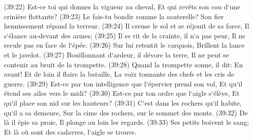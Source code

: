 \verse (39:22) Est-ce toi qui donnes la vigueur au cheval, Et qui revêts son cou d`une crinière flottante? 
\verse (39:23) Le fais-tu bondir comme la sauterelle? Son fier hennissement répand la terreur. 
\verse (39:24) Il creuse le sol et se réjouit de sa force, Il s`élance au-devant des armes; 
\verse (39:25) Il se rit de la crainte, il n`a pas peur, Il ne recule pas en face de l`épée. 
\verse (39:26) Sur lui retentit le carquois, Brillent la lance et le javelot. 
\verse (39:27) Bouillonnant d`ardeur, il dévore la terre, Il ne peut se contenir au bruit de la trompette. 
\verse (39:28) Quand la trompette sonne, il dit: En avant! Et de loin il flaire la bataille, La voix tonnante des chefs et les cris de guerre. 
\verse (39:29) Est-ce par ton intelligence que l`épervier prend son vol, Et qu`il étend ses ailes vers le midi? 
\verse (39:30) Est-ce par ton ordre que l`aigle s`élève, Et qu`il place son nid sur les hauteurs? 
\verse (39:31) C`est dans les rochers qu`il habite, qu`il a sa demeure, Sur la cime des rochers, sur le sommet des monts. 
\verse (39:32) De là il épie sa proie, Il plonge au loin les regards. 
\verse (39:33) Ses petits boivent le sang; Et là où sont des cadavres, l`aigle se trouve. 

